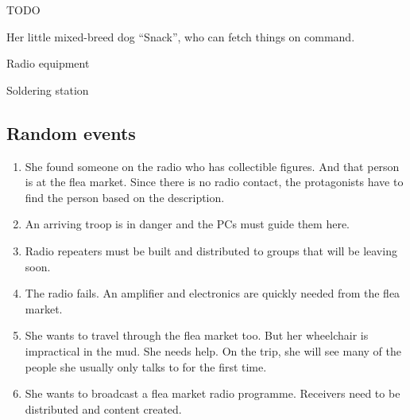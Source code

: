 \begin{npcBox}[title=Antigone]
    \begin{stunts}
    \item {}
    \end{stunts}

    \begin{stressSection}
    \end{stressSection}
    \begin{tabularx}{\textwidth}{ XX }
    \end{tabularx}

    \begin{consequences}
    \item {}
    \item {}
    \item {}
    \end{consequences}

    \begin{npcDescription}
    TODO
    \end{npcDescription}


    \begin{equipment}
    \item Her little mixed-breed dog “Snack”, who can fetch things on command.
    \item Radio equipment
    \item Soldering station
    \end{equipment}
\end{npcBox}

\subsection{Random events}

\begin{enumerate}
\item She found someone on the radio who has collectible figures. And that person is at the flea market. Since there is no radio contact, the protagonists have to find the person based on the description.
\item An arriving troop is in danger and the PCs must guide them here.
\item Radio repeaters must be built and distributed to groups that will be leaving soon.
\item The radio fails. An amplifier and electronics are quickly needed from the flea market.
\item She wants to travel through the flea market too. But her wheelchair is impractical in the mud. She needs help. On the trip, she will see many of the people she usually only talks to for the first time.
\item She wants to broadcast a flea market radio programme. Receivers need to be distributed and content created.
\end{enumerate}


